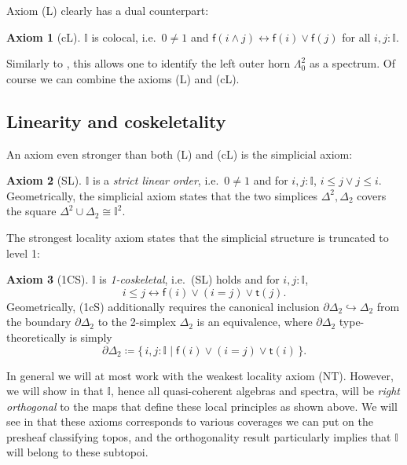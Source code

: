 \documentclass[a4paper,12pt]{amsart}
\theoremstyle{definition}
\newtheorem*{axiom}{Axiom}
\newcommand{\mbb}[1]{\mathbb{#1}}
\newcommand{\I}{\mbb I}
\newcommand{\ms}[1]{\mathsf{#1}}
\newcommand{\scomp}[2]{\{\,#1\mid#2\,\}}
\newcommand{\hook}{\hookrightarrow}
\newcommand{\eq}{\leftrightarrow}
\newcommand\istsym{\ms{t}}
\newcommand\isfsym{\ms{f}}
\newcommand\ist[1]{\istsym(#1)}
\newcommand\isf[1]{\isfsym(#1)}
\begin{document}
Axiom (L) clearly has a dual counterpart:

\begin{axiom}[cL]\label{ax:cL}
  $\I$ is colocal, i.e.\ $0 \neq 1$ and $\isf{i\wedge j} \eq \isf{i} \vee \isf{j}$ for all $i,j : \I$.
\end{axiom}

Similarly to , this allows one to identify the left outer horn $\Lambda^2_0$ as a spectrum. Of course we can combine the axioms (L) and (cL). 

\subsection{Linearity and coskeletality}

An axiom even stronger than both (L) and (cL) is the simplicial axiom:

\begin{axiom}[SL]\label{ax:SL}
  $\I$ is a \emph{strict linear order}, i.e.\ $0 \neq 1$ and for $i,j : \I$, $i \le j \vee j \le i$. Geometrically, the simplicial axiom states that the two simplices $\Delta^2,\Delta_2$ covers the square $\Delta^2 \cup \Delta_2 \cong \I^2$.
\end{axiom}

The strongest locality axiom states that the simplicial structure is truncated to level 1:

\begin{axiom}[1CS]\label{ax:1cS}
  $\I$ is \emph{1-coskeletal}, i.e.\ (SL) holds and for $i,j : \I$, 
  \[ i \le j \eq \isf{i} \vee (i = j)\vee \ist{j}\text{.} \]
  Geometrically, (1cS) additionally requires the canonical inclusion $\partial\Delta_2 \hook \Delta_2$ from the boundary $\partial\Delta_2$ to the 2-simplex $\Delta_2$ is an equivalence, where $\partial\Delta_2$ type-theoretically is simply
  \[ \partial\Delta_2 \coloneq \scomp{i,j : \I}{\isf{i} \vee (i = j) \vee \ist{i}}\text{.} \]
\end{axiom}

In general we will at most work with the weakest locality axiom (NT). However, we will show in  that $\I$, hence all quasi-coherent algebras and spectra, will be \emph{right orthogonal} to the maps that define these local principles as shown above. We will see in  that these axioms corresponds to various coverages we can put on the presheaf classifying topos, and the orthogonality result particularly implies that $\I$ will belong to these subtopoi.
\end{document}
